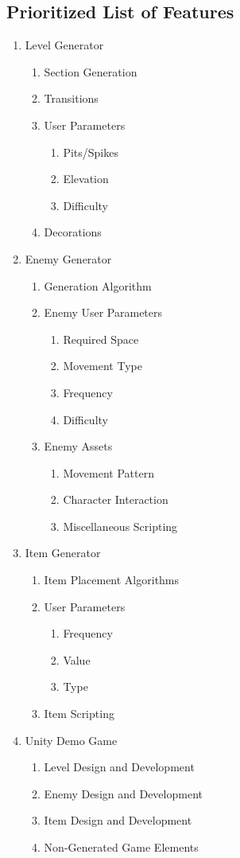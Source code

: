 \documentclass[pdftex,12pt,letter]{article}
\begin{document}
\subsection{Prioritized List of Features}
\begin{enumerate}
\item Level Generator
\begin{enumerate}
\item Section Generation
\item Transitions
\item User Parameters
\begin{enumerate}
\item Pits/Spikes
\item Elevation
\item Difficulty
\end{enumerate}
\item Decorations
\end{enumerate}

\item Enemy Generator
\begin{enumerate}
\item Generation Algorithm
\item Enemy User Parameters
\begin{enumerate}
\item Required Space
\item Movement Type
\item Frequency
\item Difficulty
\end{enumerate}
\item Enemy Assets
\begin{enumerate}
\item Movement Pattern
\item Character Interaction
\item Miscellaneous Scripting
\end{enumerate}
\end{enumerate}

\item{Item Generator}
\begin{enumerate}
\item Item Placement Algorithms
\item User Parameters
\begin{enumerate}
\item Frequency
\item Value
\item Type
\end{enumerate}
\item Item Scripting
\end{enumerate}

\item{Unity Demo Game}
\begin{enumerate}
\item Level Design and Development
\item Enemy Design and Development
\item Item Design and Development
\item Non-Generated Game Elements
\end{enumerate}
\end{enumerate}
\end{document}
